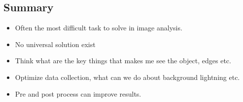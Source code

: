 \subsection*{Summary}

\begin{itemize}
	\item Often the most difficult task to solve in image analysis.
	\item No universal solution exist
	\item Think what are the key things that makes me see the object, edges etc.
	\item Optimize data collection, what can we do about background lightning etc.
	\item Pre and post process can improve results. 
\end{itemize}





















